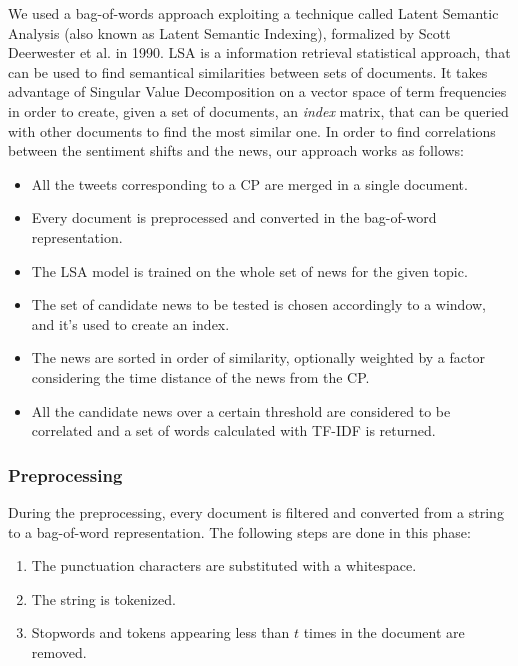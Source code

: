We used a bag-of-words approach exploiting a technique called Latent Semantic Analysis (also known as Latent Semantic Indexing), formalized by Scott Deerwester et al. in 1990\cite{LSA}. LSA is a information retrieval statistical approach, that can be used to find semantical similarities between sets of documents. It takes advantage of Singular Value Decomposition on a vector space of term frequencies in order to create, given a set of documents, an \emph{index} matrix, that can be queried with other documents to find the most similar one. In order to find correlations between the sentiment shifts and the news, our approach works as follows:
\begin{itemize}
\item All the tweets corresponding to a CP are merged in a single document.
\item Every document is preprocessed and converted in the bag-of-word representation.
\item The LSA model is trained on the whole set of news for the given topic.
\item The set of candidate news to be tested is chosen accordingly to a window, and it's used to create an index.
\item The news are sorted in order of similarity, optionally weighted by a factor considering the time distance of the news from the CP.
\item All the candidate news over a certain threshold are considered to be correlated and a set of words calculated with TF-IDF is returned.
\end{itemize}

\subsubsection*{Preprocessing}
During the preprocessing, every document is filtered and converted from a string to a bag-of-word representation. The following steps are done in this phase:
\begin{enumerate}
\item The punctuation characters are substituted with a whitespace.
\item The string is tokenized.
\item Stopwords and tokens appearing less than $t$ times in the document are removed.
\end{enumerate}

